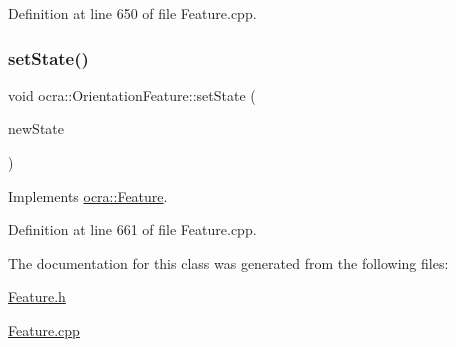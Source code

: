 Definition at line 650 of file Feature.\+cpp.

\hypertarget{classocra_1_1OrientationFeature_a2a3b8eb5334d6dcd8f3b2fc40aac46ad}{}\label{classocra_1_1OrientationFeature_a2a3b8eb5334d6dcd8f3b2fc40aac46ad} 
\subsubsection{\texorpdfstring{set\+State()}{setState()}}
{\footnotesize\ttfamily void ocra\+::\+Orientation\+Feature\+::set\+State (\begin{DoxyParamCaption}\item[{const \hyperlink{classocra_1_1TaskState}{Task\+State} \&}]{new\+State }\end{DoxyParamCaption})\hspace{0.3cm}{\ttfamily [virtual]}}



Implements \hyperlink{classocra_1_1Feature_ad16d6b176b229280649ab405531e9a30}{ocra\+::\+Feature}.



Definition at line 661 of file Feature.\+cpp.



The documentation for this class was generated from the following files\+:\begin{DoxyCompactItemize}
\item 
\hyperlink{Feature_8h}{Feature.\+h}\item 
\hyperlink{Feature_8cpp}{Feature.\+cpp}\end{DoxyCompactItemize}
